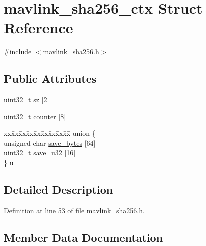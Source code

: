 \hypertarget{structmavlink__sha256__ctx}{}\section{mavlink\+\_\+sha256\+\_\+ctx Struct Reference}
\label{structmavlink__sha256__ctx}


{\ttfamily \#include $<$mavlink\+\_\+sha256.\+h$>$}

\subsection*{Public Attributes}
\begin{DoxyCompactItemize}
\item 
uint32\+\_\+t \mbox{\hyperlink{structmavlink__sha256__ctx_a03ee3df8ed24380ea86030ffbe9a489b}{sz}} \mbox{[}2\mbox{]}
\item 
uint32\+\_\+t \mbox{\hyperlink{structmavlink__sha256__ctx_ac11ac388c0a250e0d72ff7613cb5c6d3}{counter}} \mbox{[}8\mbox{]}
\item 
\begin{tabbing}
xx\=xx\=xx\=xx\=xx\=xx\=xx\=xx\=xx\=\kill
union \{\\
\>unsigned char \mbox{\hyperlink{structmavlink__sha256__ctx_a27810458c04071b0bda70321220f98fa}{save\_bytes}} \mbox{[}64\mbox{]}\\
\>uint32\_t \mbox{\hyperlink{structmavlink__sha256__ctx_a60e965634bd711dde27d9803a71ba1b7}{save\_u32}} \mbox{[}16\mbox{]}\\
\} \mbox{\hyperlink{structmavlink__sha256__ctx_aac47c20ac74d2755bf35047563645135}{u}}\\

\end{tabbing}\end{DoxyCompactItemize}


\subsection{Detailed Description}


Definition at line 53 of file mavlink\+\_\+sha256.\+h.



\subsection{Member Data Documentation}
\mbox{\label{structmavlink__sha256__ctx_ac11ac388c0a250e0d72ff7613cb5c6d3}} 
